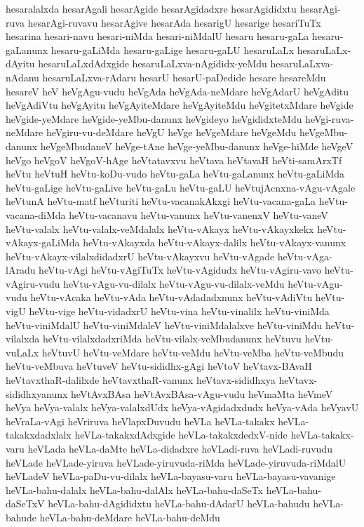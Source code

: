 {hesaralalxda
hesarAgali
hesarAgide
hesarAgidadxre
hesarAgididxtu
hesarAgi-ruva
hesarAgi-ruvavu
hesarAgive
hesarAda
hesarigU
hesarige
hesariTuTx
hesarina
hesari-navu
hesari-niMda
hesari-niMdalU
hesaru
hesaru-gaLa
hesaru-gaLanunx
hesaru-gaLiMda
hesaru-gaLige
hesaru-gaLU
hesaruLaLx
hesaruLaLx-dAyitu
hesaruLaLxdAdxgide
hesaruLaLxva-nAgididx-yeMdu
hesaruLaLxva-nAdanu
hesaruLaLxva-rAdaru
hesarU
hesarU-paDedide
hesare
hesareMdu
hesareV
heV
heVgAgu-vudu
heVgAda
heVgAda-neMdare
heVgAdarU
heVgAditu
heVgAdiVtu
heVgAyitu
heVgAyiteMdare
heVgAyiteMdu
heVgitetxMdare
heVgide
heVgide-yeMdare
heVgide-yeMbu-danunx
heVgideyo
heVgididxteMdu
heVgi-ruva-neMdare
heVgiru-vu-deMdare
heVgU
heVge
heVgeMdare
heVgeMdu
heVgeMbu-danunx
heVgeMbudaneV
heVge-tAne
heVge-yeMbu-danunx
heVge-hiMde
heVgeV
heVgo
heVgoV
heVgoV-hAge
heVtatavxvu
heVtava
heVtavaH
heVti-samArxTf
heVtu
heVtuH
heVtu-koDu-vudo
heVtu-gaLa
heVtu-gaLanunx
heVtu-gaLiMda
heVtu-gaLige
heVtu-gaLive
heVtu-gaLu
heVtu-gaLU
heVtujAcnxna-vAgu-vAgale
heVtunA
heVtu-matf
heVturiti
heVtu-vacanakAkxgi
heVtu-vacana-gaLa
heVtu-vacana-diMda
heVtu-vacanavu
heVtu-vanunx
heVtu-vanenxV
heVtu-vaneV
heVtu-valalx
heVtu-valalx-veMdalalx
heVtu-vAkayx
heVtu-vAkayxkekx
heVtu-vAkayx-gaLiMda
heVtu-vAkayxda
heVtu-vAkayx-dalilx
heVtu-vAkayx-vanunx
heVtu-vAkayx-vilalxdidadxrU
heVtu-vAkayxvu
heVtu-vAgade
heVtu-vAga-lAradu
heVtu-vAgi
heVtu-vAgiTuTx
heVtu-vAgidudx
heVtu-vAgiru-vavo
heVtu-vAgiru-vudu
heVtu-vAgu-vu-dilalx
heVtu-vAgu-vu-dilalx-veMdu
heVtu-vAgu-vudu
heVtu-vAcaka
heVtu-vAda
heVtu-vAdadadxnunx
heVtu-vAdiVtu
heVtu-vigU
heVtu-vige
heVtu-vidadxrU
heVtu-vina
heVtu-vinalilx
heVtu-viniMda
heVtu-viniMdalU
heVtu-viniMdaleV
heVtu-viniMdalalxve
heVtu-viniMdu
heVtu-vilalxda
heVtu-vilalxdadxriMda
heVtu-vilalx-veMbudanunx
heVtuvu
heVtu-vuLaLx
heVtuvU
heVtu-veMdare
heVtu-veMdu
heVtu-veMba
heVtu-veMbudu
heVtu-veMbuva
heVtuveV
heVtu-sididhx-gAgi
heVtoV
heVtavx-BAvaH
heVtavxthaR-dalilxde
heVtavxthaR-vanunx
heVtavx-sididhxya
heVtavx-sididhxyanunx
heVtAvxBAsa
heVtAvxBAsa-vAgu-vudu
heVmaMta
heVmeV
heVya
heVya-valalx
heVya-valalxdUdx
heVya-vAgidadxdudx
heVya-vAda
heVyavU
heVraLa-vAgi
heVriruva
heVlapxDuvudu
heVLa
heVLa-takakx
heVLa-takakxdadxlalx
heVLa-takakxdAdxgide
heVLa-takakxdedxV-nide
heVLa-takakx-varu
heVLada
heVLa-daMte
heVLa-didadxre
heVLadi-ruva
heVLadi-ruvudu
heVLade
heVLade-yiruva
heVLade-yiruvuda-riMda
heVLade-yiruvuda-riMdalU
heVLadeV
heVLa-paDu-vu-dilalx
heVLa-bayasu-varu
heVLa-bayasu-vavanige
heVLa-bahu-dalalx
heVLa-bahu-dalAlx
heVLa-bahu-daSeTx
heVLa-bahu-daSeTxV
heVLa-bahu-dAgididxtu
heVLa-bahu-dAdarU
heVLa-bahudu
heVLa-bahude
heVLa-bahu-deMdare
heVLa-bahu-deMdu
}
